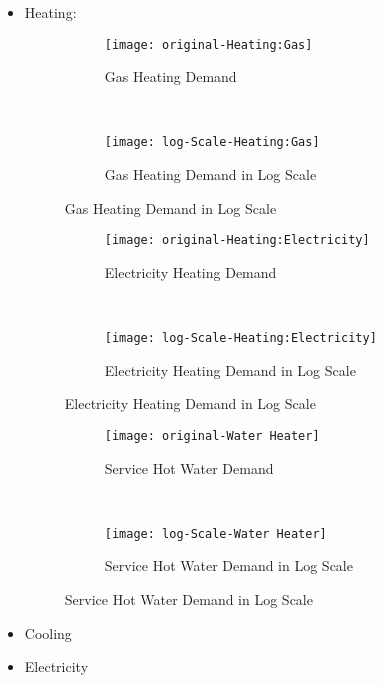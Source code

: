 \pagebreak
\begin{itemize}
\item Heating:

\begin{figure}[h!]
  \centering
  \begin{subfigure}{0.4\textwidth}
  \centering
  \texttt{[image: original-Heating:Gas]}
  \caption[Gas Heating Demand]{Gas Heating Demand}
  \label{fig:original-Heating:Gas}
\end{subfigure}
~
\begin{subfigure}{0.4\textwidth}
  \centering
  \texttt{[image: log-Scale-Heating:Gas]}
  \caption[Gas Heating Demand]{Gas Heating Demand in Log Scale}
  \label{fig:log-Scale-Heating:Gas}
\end{subfigure}
  \caption[Gas Heating Demand]{Gas Heating Demand in Log Scale}
\end{figure}

\begin{figure}[h!]
  \centering
  \begin{subfigure}{0.4\textwidth}
  \centering
  \texttt{[image: original-Heating:Electricity]}
  \caption[Electricity Heating Demand]{Electricity Heating Demand}
  \label{fig:original-Heating:Electricity}
\end{subfigure}
~
\begin{subfigure}{0.4\textwidth}
  \centering
  \texttt{[image: log-Scale-Heating:Electricity]}
  \caption[Electricity Heating Demand]{Electricity Heating Demand in Log Scale}
  \label{fig:log-Scale-Heating:Electricity}
\end{subfigure}
  \caption[Electricity Heating Demand]{Electricity Heating Demand in Log Scale}
\end{figure}

\begin{figure}[h!]
  \centering
  \begin{subfigure}{0.4\textwidth}
  \centering
  \texttt{[image: original-Water Heater]}
  \caption[Service Hot Water Demand]{Service Hot Water Demand}
  \label{fig:original-Water Heater}
\end{subfigure}
~
\begin{subfigure}{0.4\textwidth}
  \centering
  \texttt{[image: log-Scale-Water Heater]}
  \caption[Service Hot Water Demand]{Service Hot Water Demand in Log Scale}
  \label{fig:log-Scale-Water Heater}
\end{subfigure}
  \caption[Service Hot Water Demand]{Service Hot Water Demand in Log Scale}
\end{figure}

\item Cooling
\item Electricity
\end{itemize}
\pagebreak
